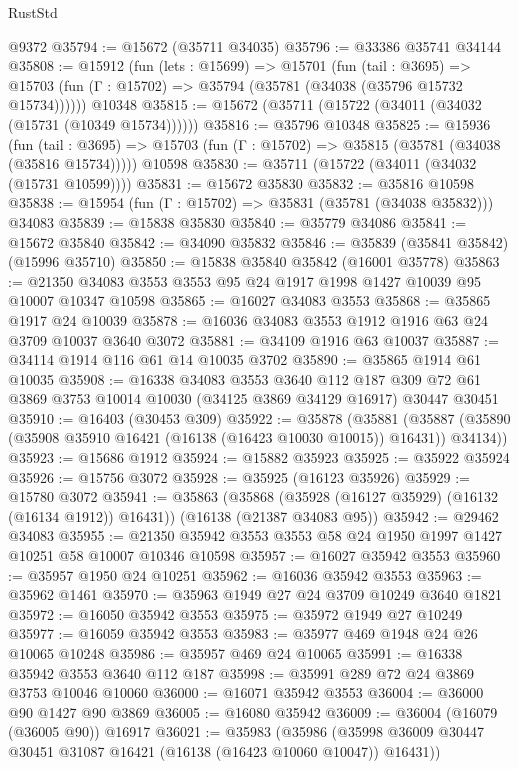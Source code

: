 \begin{lexlean}{RustStd}
\begin{coremodule}
    @9372
@35794 := @15672 (@35711 @34035)
@35796 := @33386 @35741 @34144
@35808 := @15912
    (fun (lets : @15699) =>
    @15701
      (fun (tail : @3695) =>
      @15703 (fun (Γ : @15702) => @35794 (@35781 (@34038 (@35796 @15732 @15734))))))
    @10348
@35815 := @15672 (@35711 (@15722 (@34011 (@34032 (@15731 (@10349 @15734))))))
@35816 := @35796 @10348
@35825 := @15936
    (fun (tail : @3695) => @15703 (fun (Γ : @15702) => @35815 (@35781 (@34038 (@35816 @15734)))))
    @10598
@35830 := @35711 (@15722 (@34011 (@34032 (@15731 @10599))))
@35831 := @15672 @35830
@35832 := @35816 @10598
@35838 := @15954 (fun (Γ : @15702) => @35831 (@35781 (@34038 @35832))) @34083
@35839 := @15838 @35830
@35840 := @35779 @34086
@35841 := @15672 @35840
@35842 := @34090 @35832
@35846 := @35839 (@35841 @35842) (@15996 @35710)
@35850 := @15838 @35840 @35842 (@16001 @35778)
@35863 := @21350 @34083 @3553 @3553 @95 @24 @1917 @1998 @1427 @10039 @95 @10007 @10347 @10598
@35865 := @16027 @34083 @3553
@35868 := @35865 @1917 @24 @10039
@35878 := @16036 @34083 @3553 @1912 @1916 @63 @24 @3709 @10037 @3640 @3072
@35881 := @34109 @1916 @63 @10037
@35887 := @34114 @1914 @116 @61 @14 @10035 @3702
@35890 := @35865 @1914 @61 @10035
@35908 := @16338
    @34083
    @3553
    @3640
    @112
    @187
    @309
    @72
    @61
    @3869
    @3753
    @10014
    @10030
    (@34125 @3869 @34129 @16917)
    @30447
    @30451
@35910 := @16403 (@30453 @309)
@35922 := @35878
    (@35881 (@35887 (@35890 (@35908 @35910 @16421 (@16138 (@16423 @10030 @10015)) @16431)) @34134))
@35923 := @15686 @1912
@35924 := @15882 @35923
@35925 := @35922 @35924
@35926 := @15756 @3072
@35928 := @35925 (@16123 @35926)
@35929 := @15780 @3072
@35941 := @35863
    (@35868 (@35928 (@16127 @35929) (@16132 (@16134 @1912)) @16431))
    (@16138 (@21387 @34083 @95))
@35942 := @29462 @34083
@35955 := @21350 @35942 @3553 @3553 @58 @24 @1950 @1997 @1427 @10251 @58 @10007 @10346 @10598
@35957 := @16027 @35942 @3553
@35960 := @35957 @1950 @24 @10251
@35962 := @16036 @35942 @3553
@35963 := @35962 @1461
@35970 := @35963 @1949 @27 @24 @3709 @10249 @3640 @1821
@35972 := @16050 @35942 @3553
@35975 := @35972 @1949 @27 @10249
@35977 := @16059 @35942 @3553
@35983 := @35977 @469 @1948 @24 @26 @10065 @10248
@35986 := @35957 @469 @24 @10065
@35991 := @16338 @35942 @3553 @3640 @112 @187
@35998 := @35991 @289 @72 @24 @3869 @3753 @10046 @10060
@36000 := @16071 @35942 @3553
@36004 := @36000 @90 @1427 @90 @3869
@36005 := @16080 @35942
@36009 := @36004 (@16079 (@36005 @90)) @16917
@36021 := @35983
    (@35986 (@35998 @36009 @30447 @30451 @31087 @16421 (@16138 (@16423 @10060 @10047)) @16431))

\end{coremodule}
\end{lexlean}
